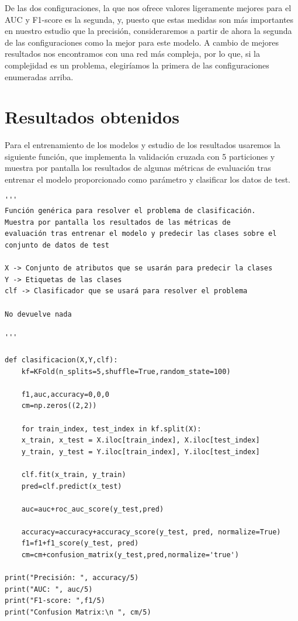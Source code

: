 \documentclass[a4paper,11pt]{article}
\begin{document}
De las dos configuraciones, la que nos ofrece valores ligeramente mejores para el AUC y F1-score es la segunda, y, puesto que estas medidas son más importantes en nuestro estudio que la precisión, consideraremos a partir de ahora la segunda de las configuraciones como la mejor para este modelo. A cambio de mejores resultados nos encontramos con una red más compleja, por lo que, si la complejidad es un problema, elegiríamos la primera de las configuraciones enumeradas arriba.



\newpage
\section{Resultados obtenidos}

Para el entrenamiento de los modelos y estudio de los resultados usaremos la siguiente función, que implementa la validación cruzada con 5 particiones y muestra por pantalla los resultados de algunas métricas de evaluación tras entrenar el modelo proporcionado como parámetro y clasificar los datos de test.


\begin{verbatim}
'''
Función genérica para resolver el problema de clasificación.
Muestra por pantalla los resultados de las métricas de 
evaluación tras entrenar el modelo y predecir las clases sobre el 
conjunto de datos de test

X -> Conjunto de atributos que se usarán para predecir la clases
Y -> Etiquetas de las clases
clf -> Clasificador que se usará para resolver el problema 

No devuelve nada 

'''

def clasificacion(X,Y,clf):
	kf=KFold(n_splits=5,shuffle=True,random_state=100)
	
	f1,auc,accuracy=0,0,0
	cm=np.zeros((2,2))
	
	for train_index, test_index in kf.split(X):
	x_train, x_test = X.iloc[train_index], X.iloc[test_index]
	y_train, y_test = Y.iloc[train_index], Y.iloc[test_index]
	
	clf.fit(x_train, y_train)
	pred=clf.predict(x_test)
	
	auc=auc+roc_auc_score(y_test,pred)
	
	accuracy=accuracy+accuracy_score(y_test, pred, normalize=True)
	f1=f1+f1_score(y_test, pred)
	cm=cm+confusion_matrix(y_test,pred,normalize='true')

print("Precisión: ", accuracy/5)
print("AUC: ", auc/5)
print("F1-score: ",f1/5)
print("Confusion Matrix:\n ", cm/5)
\end{verbatim}
\end{document}
